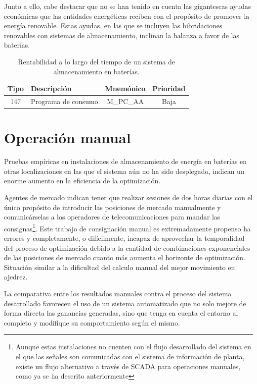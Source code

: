 Junto a ello, cabe destacar que no se han tenido en cuenta las gigantescas ayudas económicas que las entidades energéticas reciben con el propósito de promover la energía renovable. Estas ayudas, en las que se incluyen las hibridaciones renovables con sistemas de almacenamiento, inclinan la balanza a favor de las baterías.

\begin{table}[ht]
  \centering
  \begin{tabular}{|c|p{7.5cm}|c|c|}
    \hline
    Tipo & Descripción         & Mnemónico & Prioridad\\
    \hline
    147  & Programa de consumo & M\_PC\_AA & Baja     \\
    \hline
  \end{tabular}
  \caption[Rentabilidad a lo largo del tiempo de un sistema de almacenamiento en baterías.]{Rentabilidad a lo largo del tiempo de un sistema de almacenamiento en baterías.}
  \label{tab:rentabilidad-bess}
\end{table}

\section{Operación manual}
\label{makereference7.2}

Pruebas empíricas en instalaciones de almacenamiento de energía en baterías en otras localizaciones en las que el sistema aún no ha sido desplegado, indican un enorme aumento en la eficiencia de la optimización.

Agentes de mercado indican tener que realizar sesiones de dos horas diarias con el único propósito de introducir las posiciones de mercado manualmente y comunicárselas a los operadores de telecomunicaciones para mandar las consignas\footnote{Aunque estas instalaciones no cuenten con el flujo desarrollado del sistema en el que las señales son comunicadas con el sistema de información de planta, existe un flujo alternativo a través de SCADA para operaciones manuales, como ya se ha descrito anteriormente}. Este trabajo de consignación manual es extremadamente propenso ha errores y completamente, o difícilmente, incapaz de aprovechar la temporalidad del proceso de optimización debido a la cantidad de combinaciones exponenciales de las posiciones de mercado cuanto más aumenta el horizonte de optimización. Situación similar a la dificultad del calculo manual del mejor movimiento en ajedrez.

La comparativa entre los resultados manuales contra el proceso del sistema desarrollado favorecen el uso de un sistema automatizado que no solo mejore de forma directa las ganancias generadas, sino que tenga en cuenta el entorno al completo y modifique su comportamiento según el mismo.

